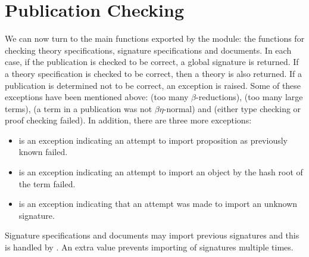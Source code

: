 \section{Publication Checking}

We can now turn to the main functions exported by the {} module:
the functions for checking theory specifications, signature specifications
and documents.
In each case, if the publication is checked to be correct, a global signature
is returned.
If a theory specification is checked to be correct, then a theory is also returned.
If a publication is determined not to be correct, an exception is raised.
Some of these exceptions have been mentioned above:
{} (too many $\beta$-reductions),
{} (too many large terms),
{} (a term in a publication was not $\beta\eta$-normal)
and
{} (either type checking or proof checking failed).
In addition, there are three more exceptions:
\begin{itemize}
\item {} is an exception indicating an attempt to import proposition 
as previously known failed.
\item {} is an exception indicating an attempt to import an object
by the hash root of the term failed.
\item {} is an exception indicating that an attempt was made
to import an unknown signature.
\end{itemize}

Signature specifications and documents may import previous signatures and this 
is handled by {}.
An extra value {} prevents importing of signatures multiple times.

